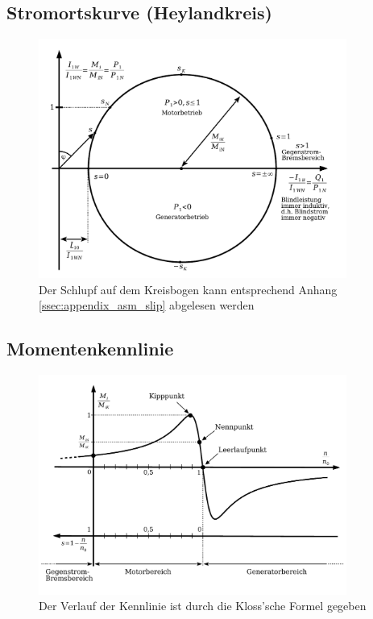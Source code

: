 \documentclass[11pt]{article}
\begin{document}
\subsection*{Stromortskurve (Heylandkreis)}
\begin{figure}[H]
	\centering
	\includegraphics[width=0.9\textwidth]{img/asynchronmaschine_heylandkreis.pdf}
	\caption*{Der Schlupf auf dem Kreisbogen kann entsprechend Anhang \ref{ssec:appendix_asm_slip} abgelesen werden}
\end{figure}

\subsection*{Momentenkennlinie}
\begin{figure}[H]
	\centering
	\includegraphics[width=0.9\textwidth]{img/asynchronmaschine_kennlinie.pdf}
	\caption*{Der Verlauf der Kennlinie ist durch die Kloss'sche Formel gegeben}
\end{figure}
\end{document}
